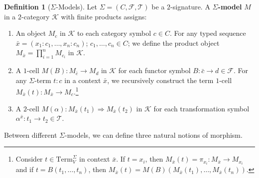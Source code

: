\documentclass[11pt]{article}
\theoremstyle{plain}
\theoremstyle{definition}
\newtheorem{definition}[theorem]{Definition}
\numberwithin{equation}{section}
\newcommand{\K}{\mathcal{K}}
\newcommand{\Term}{\mathrm{Term}}
\begin{document}
\begin{definition}[$\Sigma$-Models]
   Let $\Sigma = (C,\mathcal{F}, \mathcal{T})$ be a $2$-signature. A \textbf{$\Sigma$-model} $M$ in a $2$-category $\K$ with finite products assigns:
   \begin{enumerate}
       \item An object $M_c$ in $\K$ to each category symbol $c \in C$. For any typed sequence $\bar{x} = (x_1 \colon c_1, \dots, x_n \colon c_n)$; $c_1,\ldots, c_n\in C$; we define the product object $M_{\bar{x}} = \prod_{i=1}^n M_{c_i}$ in $\K$.
       \item A $1$-cell $M(B) \colon M_{\bar{c}} \to M_d$ in $\K$ for each functor symbol $B \colon \bar{c} \to d \in \mathcal{F}$. For any $\Sigma$-term $t \colon c$ in a context $\bar{x}$, we recursively construct the term $1$-cell $M_{\bar{x}}(t) \colon M_{\bar{x}} \to M_c$.\footnote{Consider $t\in \Term^\Sigma_V$ in context $\bar{x}$. If $t = x_i$, then $M_{\bar{x}}(t) = \pi_{x_i}\colon M_{\bar{x}}\to M_{x_i}$ and if $t = B(t_1,\ldots, t_n)$, then $M_{\bar{x}}(t) = M(B)(M_{\bar{x}}(t_1),\ldots, M_{\bar{x}}(t_n))$.}
       \item A $2$-cell $M(\alpha) \colon M_{\bar{x}}(t_1) \Rightarrow M_{\bar{x}}(t_2)$ in $\K$ for each transformation symbol $\alpha^{\bar{x}} \colon t_1 \to t_2 \in \mathcal{T}$.
   \end{enumerate}
\end{definition}

Between different $\Sigma$-models, we can define three natural notions of morphism.
\end{document}
